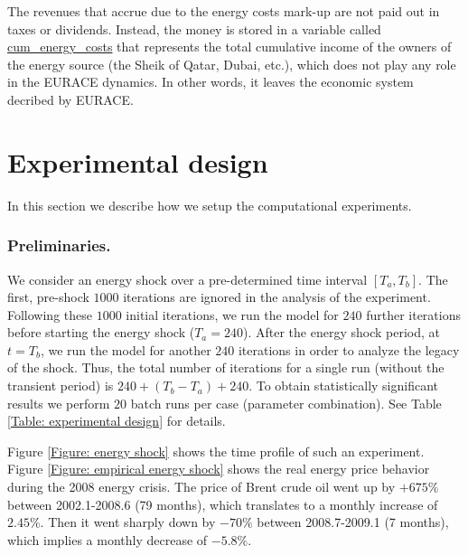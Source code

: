 The revenues that accrue due to the energy costs mark-up are not paid out in
taxes or dividends. Instead, the money is stored in a variable called %
\url{cum_energy_costs} that represents the total cumulative income of the
owners of the energy source (the Sheik of Qatar, Dubai, etc.), which does
not play any role in the EURACE dynamics. In other words, it leaves the
economic system decribed by EURACE.

\section{Experimental design}

In this section we describe how we setup the computational experiments.

\subsubsection*{Preliminaries.}

\bigskip We consider an energy shock over a pre-determined time interval $%
\left[ T_{a},T_{b}\right]$. The first, pre-shock $1000$ iterations are
ignored in the analysis of the experiment. Following these $1000$ initial
iterations, we run the model for $240$ further iterations before starting
the energy shock ($T_{a}=240$). After the energy shock period, at $t=T_{b}$,
we run the model for another $240$ iterations in order to analyze the legacy
of the shock. Thus, the total number of iterations for a single run (without
the transient period) is $240+(T_{b}-T_{a})+240$. To obtain statistically
significant results we perform $20$ batch runs per case (parameter
combination). See Table \ref{Table: experimental design} for details.

Figure \ref{Figure: energy shock} shows the time profile of such an
experiment. Figure \ref{Figure: empirical energy shock} shows the real
energy price behavior during the 2008 energy crisis. The price of Brent
crude oil went up by $+675\%$ between 2002.1-2008.6 (79 months), which
translates to a monthly increase of $2.45\%$. Then it went sharply down by $%
-70\%$ between 2008.7-2009.1 (7 months), which implies a monthly decrease of
$-5.8\%$.

